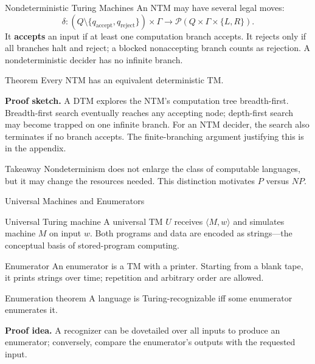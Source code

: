 \documentclass[10pt]{beamer}
\begin{document}
\begin{frame}{Nondeterministic Turing Machines}
  \small
  An NTM may have several legal moves:
  \[
    \delta:(Q\setminus\{q_{\mathrm{accept}},q_{\mathrm{reject}}\})\times\Gamma
      \to \mathcal{P}(Q\times\Gamma\times\{L,R\}).
  \]
  It \textbf{accepts} an input if at least one computation branch accepts. It rejects only if all
  branches halt and reject; a blocked nonaccepting branch counts as rejection.
  A nondeterministic decider has no infinite branch.
  \begin{block}{Theorem}
    Every NTM has an equivalent deterministic TM.
  \end{block}
  \textbf{Proof sketch.}
  A DTM explores the NTM's computation tree breadth-first. Breadth-first search eventually reaches
  any accepting node; depth-first search may become trapped on one infinite branch.
  For an NTM decider, the search also terminates if no branch accepts.
  The finite-branching argument justifying this is in the appendix.
  \begin{alertblock}{Takeaway}
    Nondeterminism does not enlarge the class of computable languages, but it may change the
    resources needed. This distinction motivates $P$ versus $NP$.
  \end{alertblock}
\end{frame}

\begin{frame}{Universal Machines and Enumerators}
  \small
  \begin{block}{Universal Turing machine}
    A universal TM $U$ receives $\langle M,w\rangle$ and simulates machine $M$ on input $w$.
    Both programs and data are encoded as strings---the conceptual basis of stored-program computing.
  \end{block}
  \begin{block}{Enumerator}
    An enumerator is a TM with a printer. Starting from a blank tape, it prints strings over time;
    repetition and arbitrary order are allowed.
  \end{block}
  \begin{block}{Enumeration theorem}
    A language is Turing-recognizable iff some enumerator enumerates it.
  \end{block}
  \textbf{Proof idea.} A recognizer can be dovetailed over all inputs to produce an enumerator;
  conversely, compare the enumerator's outputs with the requested input.
\end{frame}
\end{document}
